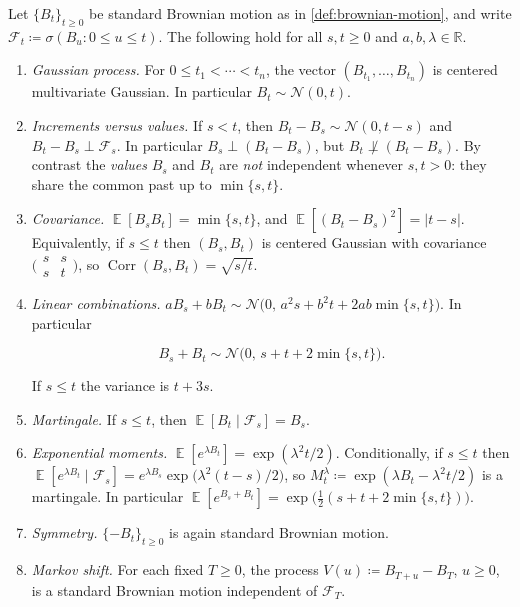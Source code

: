 \documentclass[11pt,a4paper]{article}
\DeclareMathOperator{\Corr}{Corr}
\DeclareMathOperator{\E}{\mathbb{E}}
\begin{document}
\begin{proposition}
\label{prop:bm-calculus}
Let \(\{B_t\}_{t\ge 0}\) be standard Brownian motion as in \cref{def:brownian-motion}, and write \(\mathcal{F}_t\coloneqq\sigma(B_u:0\le u\le t)\). The following hold for all \(s,t\ge 0\) and \(a,b,\lambda\in\mathbb{R}\).
\begin{enumerate}[label=\textup{(\roman*)}, ref=\textup{(\roman*)}]
    \item
    \label{itm:bm-gaussian}
    \emph{Gaussian process.} For \(0\le t_1<\cdots<t_n\), the vector \((B_{t_1},\dots,B_{t_n})\) is centered multivariate Gaussian. In particular \(B_t\sim\mathcal{N}(0,t)\).
    \item
    \label{itm:bm-indep}
    \emph{Increments versus values.} If \(s<t\), then \(B_t-B_s\sim\mathcal{N}(0,t-s)\) and \(B_t-B_s\perp\mathcal{F}_s\). In particular \(B_s\perp(B_t-B_s)\), but \(B_t\not\perp(B_t-B_s)\). By contrast the \emph{values} \(B_s\) and \(B_t\) are \emph{not} independent whenever \(s,t>0\): they share the common past up to \(\min\{s,t\}\).
    \item
    \label{itm:bm-cov}
    \emph{Covariance.} \(\E[B_s B_t]=\min\{s,t\}\), and \(\E[(B_t-B_s)^2]=|t-s|\). Equivalently, if \(s\le t\) then \((B_s,B_t)\) is centered Gaussian with covariance \(\bigl(\begin{smallmatrix}s&s\\s&t\end{smallmatrix}\bigr)\), so \(\Corr(B_s,B_t)=\sqrt{s/t}\).
    \item
    \label{itm:bm-lincomb}
    \emph{Linear combinations.} \(a B_s+b B_t\sim\mathcal{N}\bigl(0,\,a^2 s+b^2 t+2ab\min\{s,t\}\bigr)\). In particular

\[
B_s+B_t
\sim
\mathcal{N}\bigl(0,\,s+t+2\min\{s,t\}\bigr).
\]

If \(s\le t\) the variance is \(t+3s\).
    \item
    \label{itm:bm-mg}
    \emph{Martingale.} If \(s\le t\), then \(\E[B_t\mid\mathcal{F}_s]=B_s\).
    \item
    \label{itm:bm-exp}
    \emph{Exponential moments.} \(\E[e^{\lambda B_t}]=\exp(\lambda^2 t/2)\). Conditionally, if \(s\le t\) then \(\E[e^{\lambda B_t}\mid\mathcal{F}_s]=e^{\lambda B_s}\exp\bigl(\lambda^2(t-s)/2\bigr)\), so \(M_t^\lambda\coloneqq\exp(\lambda B_t-\lambda^2 t/2)\) is a martingale. In particular \(\E[e^{B_s+B_t}]=\exp\bigl(\tfrac12(s+t+2\min\{s,t\})\bigr)\).
    \item
    \label{itm:bm-sym}
    \emph{Symmetry.} \(\{-B_t\}_{t\ge 0}\) is again standard Brownian motion.
    \item
    \label{itm:bm-shift}
    \emph{Markov shift.} For each fixed \(T\ge 0\), the process \(V(u)\coloneqq B_{T+u}-B_T\), \(u\ge 0\), is a standard Brownian motion independent of \(\mathcal{F}_T\).
\end{enumerate}
\end{proposition}
\end{document}

